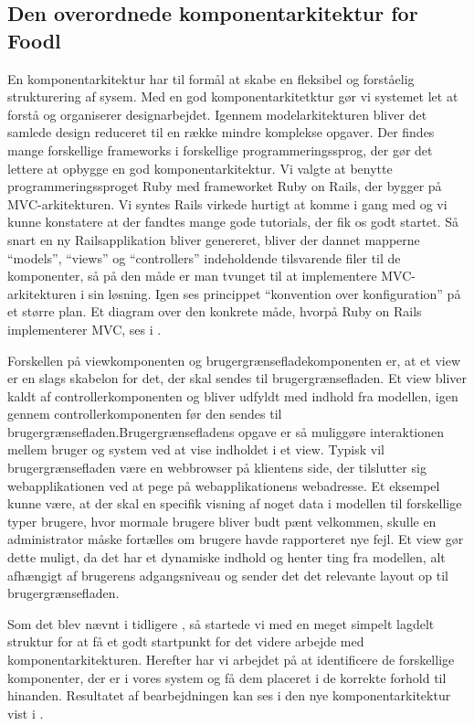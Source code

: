 \subsection{Den overordnede komponentarkitektur for Foodl}
\label{sec:overordnetkomponent}
En komponentarkitektur har til formål at skabe en fleksibel og forståelig strukturering af sysem. Med en god komponentarkitetktur gør vi systemet let at forstå og organiserer designarbejdet. Igennem modelarkitekturen bliver det samlede design reduceret til en række mindre komplekse opgaver\cite[s.~185]{ooad}. Der findes mange forskellige frameworks i forskellige programmeringssprog, der gør det lettere at opbygge en god komponentarkitektur. Vi valgte at benytte programmeringssproget Ruby med frameworket Ruby on Rails, der bygger på MVC-arkitekturen. Vi syntes Rails virkede hurtigt at komme i gang med og vi kunne konstatere at der fandtes mange gode tutorials, der fik os godt startet. Så snart en ny Railsapplikation bliver genereret, bliver der dannet mapperne ``models'', ``views'' og ``controllers'' indeholdende tilsvarende filer til de komponenter, så på den måde er man tvunget til at implementere MVC-arkitekturen i sin løsning. Igen ses princippet ``konvention over konfiguration'' på et større plan. Et diagram over den konkrete måde, hvorpå Ruby on Rails implementerer MVC, ses i .

Forskellen på viewkomponenten og brugergrænsefladekomponenten er, at et view er en slags skabelon for det, der skal sendes til brugergrænsefladen. Et view bliver kaldt af controllerkomponenten og bliver udfyldt med indhold fra modellen, igen gennem controllerkomponenten før den sendes til brugergrænsefladen.Brugergrænsefladens opgave er så muliggøre interaktionen mellem bruger og system ved at vise indholdet i et view. Typisk vil brugergrænsefladen være en webbrowser på klientens side, der tilslutter sig webapplikationen ved at pege på webapplikationens webadresse. Et eksempel kunne være, at der skal en specifik visning af noget data i modellen til forskellige typer brugere, hvor mormale brugere bliver budt pænt velkommen, skulle en administrator måske fortælles om brugere havde rapporteret nye fejl. Et view gør dette muligt, da det har et dynamiske indhold og henter ting fra modellen, alt afhængigt af brugerens adgangsniveau og sender det det relevante layout op til brugergrænsefladen. 

Som det blev nævnt i tidligere , så startede vi med en meget simpelt lagdelt struktur for at få et godt startpunkt for det videre arbejde med komponentarkitekturen. Herefter har vi arbejdet på at identificere de forskellige komponenter, der er i vores system og få dem placeret i de korrekte forhold til hinanden. Resultatet af bearbejdningen kan ses i den nye komponentarkitektur vist i .

